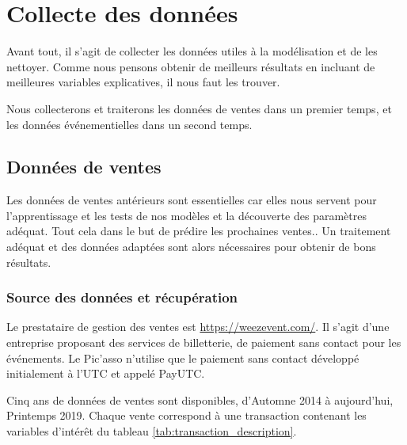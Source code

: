 \section{Collecte des données}
\label{sec:collecte}

Avant tout, il s'agit de collecter les données utiles à la modélisation et de les nettoyer. Comme nous pensons obtenir de meilleurs résultats en incluant de meilleures variables explicatives, il nous faut les trouver.

Nous collecterons et traiterons les données de ventes dans un premier temps, et les données événementielles dans un second temps.


\subsection{Données de ventes}
\label{subsec:data_ventes}

Les données de ventes antérieurs sont essentielles car elles nous servent pour l'apprentissage et les tests de nos modèles et la découverte des paramètres adéquat. Tout cela dans le but de prédire les prochaines ventes..
Un traitement adéquat et des données adaptées sont alors nécessaires pour obtenir de bons résultats.

\subsubsection{Source des données et récupération}
\label{subsec:data_ventes_sources}

Le prestataire de gestion des ventes est \href{Weezevent}{https://weezevent.com/}. Il s'agit d'une entreprise proposant des services de billetterie, de paiement sans contact pour les événements. Le Pic'asso n'utilise que le paiement sans contact développé initialement à l'UTC et appelé PayUTC.

Cinq ans de données de ventes sont disponibles, d'Automne 2014 à aujourd'hui, Printemps 2019. Chaque vente correspond à une transaction contenant les variables d'intérêt du tableau \ref{tab:transaction_description}.

